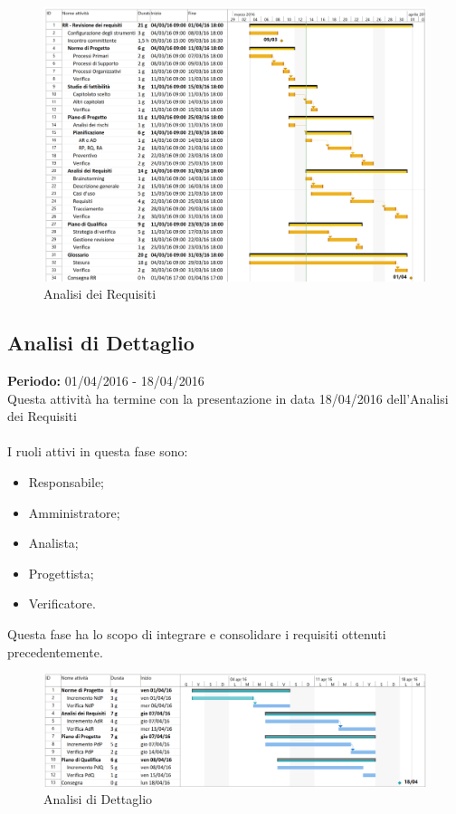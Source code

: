 \newpage
\begin{figure}
	\centering
	\includegraphics[width= 16cm]{AR.png}
	\caption{Analisi dei Requisiti}
\end{figure}


\subsection{Analisi di Dettaglio}
\textbf{Periodo:} 01/04/2016 - 18/04/2016\\
Questa attività ha termine con la presentazione in data 18/04/2016 dell'Analisi 
dei Requisiti\\\\
I ruoli attivi in questa fase sono:

\begin{itemize}
	\item Responsabile;
	\item Amministratore;
	\item Analista;
	\item Progettista;
	\item Verificatore.
\end{itemize}
Questa fase ha lo scopo di integrare e consolidare i requisiti ottenuti 
precedentemente.

\newpage
\begin{figure}
	\centering
	\includegraphics[width= 16cm]{AD.png}
	\caption{Analisi di Dettaglio}
\end{figure}

